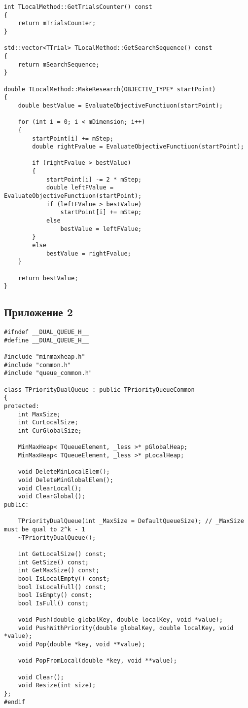 \begin{lstlisting}[frame=single]
int TLocalMethod::GetTrialsCounter() const
{
	return mTrialsCounter;
}

std::vector<TTrial> TLocalMethod::GetSearchSequence() const
{
	return mSearchSequence;
}

double TLocalMethod::MakeResearch(OBJECTIV_TYPE* startPoint)
{
	double bestValue = EvaluateObjectiveFunctiuon(startPoint);

	for (int i = 0; i < mDimension; i++)
	{
		startPoint[i] += mStep;
		double rightFvalue = EvaluateObjectiveFunctiuon(startPoint);

		if (rightFvalue > bestValue)
		{
			startPoint[i] -= 2 * mStep;
			double leftFValue = EvaluateObjectiveFunctiuon(startPoint);
			if (leftFValue > bestValue)
				startPoint[i] += mStep;
			else
				bestValue = leftFValue;
		}
		else
			bestValue = rightFvalue;
	}

	return bestValue;
}
\end{lstlisting}

\subsection{Приложение 2}
\label{attach2}
\begin{lstlisting}[frame=single]
#ifndef __DUAL_QUEUE_H__
#define __DUAL_QUEUE_H__

#include "minmaxheap.h"
#include "common.h"
#include "queue_common.h"

class TPriorityDualQueue : public TPriorityQueueCommon
{
protected:
	int MaxSize;
	int CurLocalSize;
	int CurGlobalSize;

	MinMaxHeap< TQueueElement, _less >* pGlobalHeap;
	MinMaxHeap< TQueueElement, _less >* pLocalHeap;

	void DeleteMinLocalElem();
	void DeleteMinGlobalElem();
	void ClearLocal();
	void ClearGlobal();
public:

	TPriorityDualQueue(int _MaxSize = DefaultQueueSize); // _MaxSize must be qual to 2^k - 1
	~TPriorityDualQueue();

	int GetLocalSize() const;
	int GetSize() const;
	int GetMaxSize() const;
	bool IsLocalEmpty() const;
	bool IsLocalFull() const;
	bool IsEmpty() const;
	bool IsFull() const;

	void Push(double globalKey, double localKey, void *value);
	void PushWithPriority(double globalKey, double localKey, void *value);
	void Pop(double *key, void **value);

	void PopFromLocal(double *key, void **value);

	void Clear();
	void Resize(int size);
};
#endif
\end{lstlisting}

